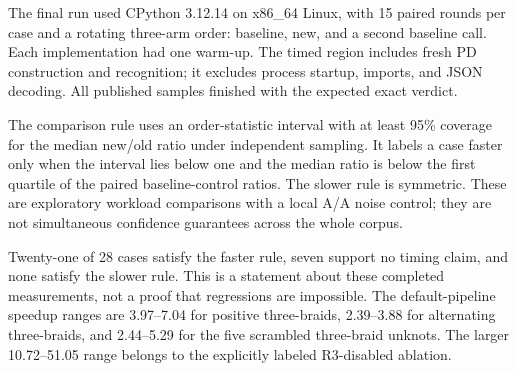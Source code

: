 The final run used CPython 3.12.14 on x86\_64 Linux, with 15 paired
rounds per case and a rotating three-arm order: baseline, new, and a
second baseline call. Each implementation had one warm-up. The timed
region includes fresh PD construction and recognition; it excludes
process startup, imports, and JSON decoding. All published samples
finished with the expected exact verdict.

The comparison rule uses an order-statistic interval with at least 95\%
coverage for the median new/old ratio under independent sampling. It
labels a case faster only when the interval lies below one and the
median ratio is below the first quartile of the paired baseline-control
ratios. The slower rule is symmetric. These are exploratory workload
comparisons with a local A/A noise control; they are not simultaneous
confidence guarantees across the whole corpus.

Twenty-one of 28 cases satisfy the faster rule, seven support no timing
claim, and none satisfy the slower rule. This is a statement about these
completed measurements, not a proof that regressions are impossible.
The default-pipeline speedup ranges are 3.97--7.04 for positive
three-braids, 2.39--3.88 for alternating three-braids, and 2.44--5.29
for the five scrambled three-braid unknots. The larger 10.72--51.05
range belongs to the explicitly labeled R3-disabled ablation.


